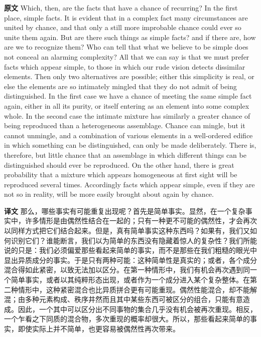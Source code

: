 \documentclass[UTF8]{ctexart}
\newenvironment{english}{\par\small\noindent\textbf{原文}\quad\ignorespaces}{\par}
\newenvironment{zhtranslation}{\par\noindent\textbf{译文}\quad\ignorespaces}{\par\vspace{0.35em}}
\begin{document}
\begin{english}
Which, then, are the facts that have a chance of recurring? In the first place, simple facts. It is evident that in a complex fact many circumstances are united by chance, and that only a still more improbable chance could ever so unite them again. But are there such things as simple facts? and if there are, how are we to recognize them? Who can tell that what we believe to be simple does not conceal an alarming complexity? All that we can say is that we must prefer facts which appear simple, to those in which our rude vision detects dissimilar elements. Then only two alternatives are possible; either this simplicity is real, or else the elements are so intimately mingled that they do not admit of being distinguished. In the first case we have a chance of meeting the same simple fact again, either in all its purity, or itself entering as an element into some complex whole. In the second case the intimate mixture has similarly a greater chance of being reproduced than a heterogeneous assemblage. Chance can mingle, but it cannot unmingle, and a combination of various elements in a well-ordered edifice in which something can be distinguished, can only be made deliberately. There is, therefore, but little chance that an assemblage in which different things can be distinguished should ever be reproduced. On the other hand, there is great probability that a mixture which appears homogeneous at first sight will be reproduced several times. Accordingly facts which appear simple, even if they are not so in reality, will be more easily brought about again by chance.
\end{english}
\begin{zhtranslation}
那么，哪些事实有可能重复出现呢？首先是简单事实。显然，在一个复杂事实中，许多情形是由偶然性结合在一起的；只有一种更不可能的偶然性，才会再次以同样方式把它们结合起来。但是，真有简单事实这种东西吗？如果有，我们又如何识别它们？谁能断言，我们以为简单的东西没有隐藏着惊人的复杂性？我们所能说的只是：我们必须偏爱那些看起来简单的事实，而不是那些在我们粗糙的眼光中显出异质成分的事实。于是只有两种可能：这种简单性是真实的；或者，各个成分混合得如此紧密，以致无法加以区分。在第一种情形中，我们有机会再次遇到同一个简单事实，或者以其纯粹形态出现，或者作为一个成分进入某个复杂整体。在第二种情形中，这种紧密混合也比异质拼合更有可能重现。偶然性能混合，却不能解混；由多种元素构成、秩序井然而且其中某些东西可被区分的组合，只能有意造成。因此，一个其中可以区分出不同事物的集合几乎没有机会被再次重现。相反，一个乍看之下同质的混合物，多次重现的概率却很大。所以，那些看起来简单的事实，即使实际上并不简单，也更容易被偶然性再次带来。\end{zhtranslation}
\end{document}
